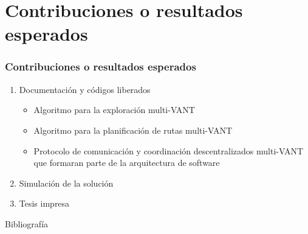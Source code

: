 \documentclass[
	12pt, %
	aspectratio=169, %
]{beamer}
\begin{document}
\section{Contribuciones o resultados esperados}

\begin{frame}

  \frametitle{Contribuciones o resultados esperados}

  \begin{enumerate}
  \item<1-> Documentación y códigos liberados
    \begin{itemize}
    \item Algoritmo para la exploración multi-VANT
    \item Algoritmo para la planificación de rutas multi-VANT
    \item Protocolo de comunicación y coordinación descentralizados multi-VANT que formaran parte de la arquitectura de software
    \end{itemize}
  \item<2-> Simulación de la solución
  \item<3-> Tesis impresa
  \end{enumerate}
  
\end{frame}

\begin{frame}{Bibliografía}
  \tiny
  
  
\end{frame}
\end{document}
